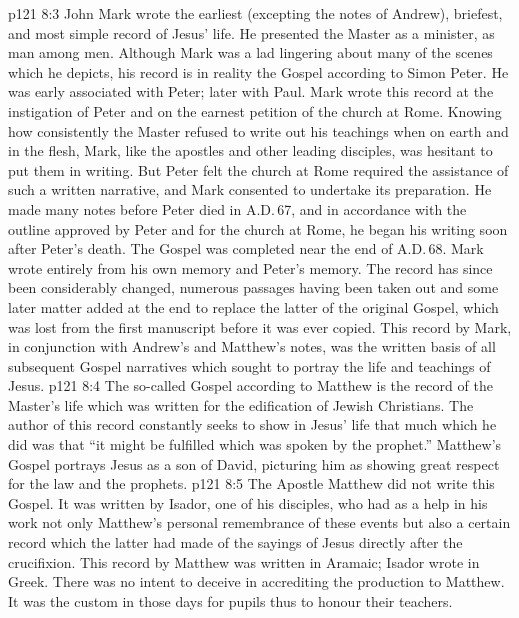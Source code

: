 \vs p121 8:3 \bibnobreakspace {} John Mark wrote the earliest (excepting the notes of Andrew), briefest, and most simple record of Jesus’ life. He presented the Master as a minister, as man among men. Although Mark was a lad lingering about many of the scenes which he depicts, his record is in reality the Gospel according to Simon Peter. He was early associated with Peter; later with Paul. Mark wrote this record at the instigation of Peter and on the earnest petition of the church at Rome. Knowing how consistently the Master refused to write out his teachings when on earth and in the flesh, Mark, like the apostles and other leading disciples, was hesitant to put them in writing. But Peter felt the church at Rome required the assistance of such a written narrative, and Mark consented to undertake its preparation. He made many notes before Peter died in A.D.\,67, and in accordance with the outline approved by Peter and for the church at Rome, he began his writing soon after Peter’s death. The Gospel was completed near the end of A.D.\,68. Mark wrote entirely from his own memory and Peter’s memory. The record has since been considerably changed, numerous passages having been taken out and some later matter added at the end to replace the latter  of the original Gospel, which was lost from the first manuscript before it was ever copied. This record by Mark, in conjunction with Andrew’s and Matthew’s notes, was the written basis of all subsequent Gospel narratives which sought to portray the life and teachings of Jesus.
\vs p121 8:4 \bibnobreakspace {} The so\hyp{}called Gospel according to Matthew is the record of the Master’s life which was written for the edification of Jewish Christians. The author of this record constantly seeks to show in Jesus’ life that much which he did was that “it might be fulfilled which was spoken by the prophet.” Matthew’s Gospel portrays Jesus as a son of David, picturing him as showing great respect for the law and the prophets.
\vs p121 8:5 The Apostle Matthew did not write this Gospel. It was written by Isador, one of his disciples, who had as a help in his work not only Matthew’s personal remembrance of these events but also a certain record which the latter had made of the sayings of Jesus directly after the crucifixion. This record by Matthew was written in Aramaic; Isador wrote in Greek. There was no intent to deceive in accrediting the production to Matthew. It was the custom in those days for pupils thus to honour their teachers.
